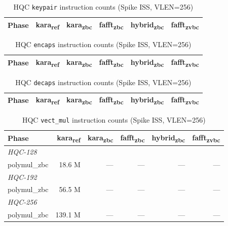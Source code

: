 
\begin{table}[h]
  \centering
  \caption{HQC \texttt{keypair} instruction counts (Spike ISS, VLEN=256)}
  \label{tab:keypair_counts}
  \begin{tabular}{lrrrrr}
    \toprule
    Phase & kara\textsubscript{ref} & kara\textsubscript{zbc} & fafft\textsubscript{zbc} & hybrid\textsubscript{zbc} & fafft\textsubscript{zvbc} \\
    \midrule
    \bottomrule
  \end{tabular}
\end{table}

\begin{table}[h]
  \centering
  \caption{HQC \texttt{encaps} instruction counts (Spike ISS, VLEN=256)}
  \label{tab:encaps_counts}
  \begin{tabular}{lrrrrr}
    \toprule
    Phase & kara\textsubscript{ref} & kara\textsubscript{zbc} & fafft\textsubscript{zbc} & hybrid\textsubscript{zbc} & fafft\textsubscript{zvbc} \\
    \midrule
    \bottomrule
  \end{tabular}
\end{table}

\begin{table}[h]
  \centering
  \caption{HQC \texttt{decaps} instruction counts (Spike ISS, VLEN=256)}
  \label{tab:decaps_counts}
  \begin{tabular}{lrrrrr}
    \toprule
    Phase & kara\textsubscript{ref} & kara\textsubscript{zbc} & fafft\textsubscript{zbc} & hybrid\textsubscript{zbc} & fafft\textsubscript{zvbc} \\
    \midrule
    \bottomrule
  \end{tabular}
\end{table}

\begin{table}[h]
  \centering
  \caption{HQC \texttt{vect_mul} instruction counts (Spike ISS, VLEN=256)}
  \label{tab:vect_mul_counts}
  \begin{tabular}{lrrrrr}
    \toprule
    Phase & kara\textsubscript{ref} & kara\textsubscript{zbc} & fafft\textsubscript{zbc} & hybrid\textsubscript{zbc} & fafft\textsubscript{zvbc} \\
    \midrule
    \multicolumn{6}{l}{\textit{HQC-128}} \\
    polymul_zbc & 18.6 M & — & — & — & — \\
    \multicolumn{6}{l}{\textit{HQC-192}} \\
    polymul_zbc & 56.5 M & — & — & — & — \\
    \multicolumn{6}{l}{\textit{HQC-256}} \\
    polymul_zbc & 139.1 M & — & — & — & — \\
    \bottomrule
  \end{tabular}
\end{table}
